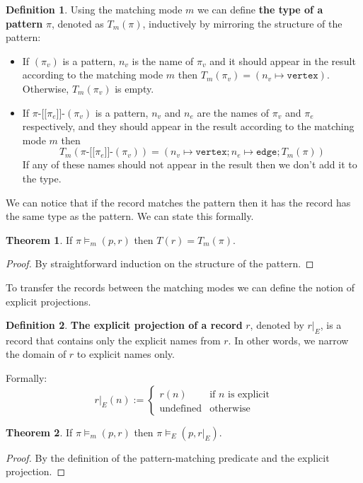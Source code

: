 \documentclass[14pt]{constructor-thesis}
\theoremstyle{definition}
\newtheorem{theorem}{Theorem}
\newtheorem{definition}{Definition}
\newcommand{\patternstart}[1]{(#1)}
\newcommand{\patternhop}[3]{#1 \texttt{-[[} #2 \texttt{]]-} (#3)}
\begin{document}
\begin{definition}
  Using the matching mode $m$ we can define \textbf{the type of a pattern} $\pi$, denoted as $T_m(\pi)$, inductively by mirroring the structure of the pattern:
  \begin{itemize}
    \item If $\patternstart{\pi_v}$ is a pattern, $n_v$ is the name of $\pi_v$ and it should appear in the result according to the matching mode $m$ then $T_m \patternstart{\pi_v} = (n_v \mapsto \texttt{vertex})$. Otherwise, $T_m \patternstart{\pi_v}$ is empty.
    \item If $\patternhop{\pi}{\pi_e}{\pi_v}$ is a pattern, $n_v$ and $n_e$ are the names of $\pi_v$ and $\pi_e$ respectively, and they should appear in the result according to the matching mode $m$ then
    $$T_m(\patternhop{\pi}{\pi_e}{\pi_v}) = (n_v \mapsto \texttt{vertex}; n_e \mapsto \texttt{edge}; T_m(\pi))$$ 
    If any of these names should not appear in the result then we don't add it to the type.
  \end{itemize}
\end{definition}

We can notice that if the record matches the pattern then it has the record has the same type as the pattern. We can state this formally.
\begin{theorem}
  \label{thm:matching-mode-type}
  If $\pi \models_m (p, r)$ then $T(r) = T_m(\pi)$.
\end{theorem}
\begin{proof}
  By straightforward induction on the structure of the pattern.
\end{proof}

To transfer the records between the matching modes we can define the notion of explicit projections.

\begin{definition}
  \textbf{The explicit projection of a record} $r$, denoted by $r |_E$, is a record that contains only the explicit names from $r$. In other words, we narrow the domain of $r$ to explicit names only.

  Formally:
  $$ r|_E(n) :=
    \begin{cases}
      r(n) & \text{if $n$ is explicit} \\
      \text{undefined} & \text{otherwise}
    \end{cases} $$
\end{definition}

\begin{theorem}
  \label{thm:matching-mode-narrow}
  If $\pi \models_m (p, r)$ then $\pi \models_E (p, r |_E)$.
\end{theorem}
\begin{proof}
  By the definition of the pattern-matching predicate and the explicit projection.
\end{proof}
\end{document}
